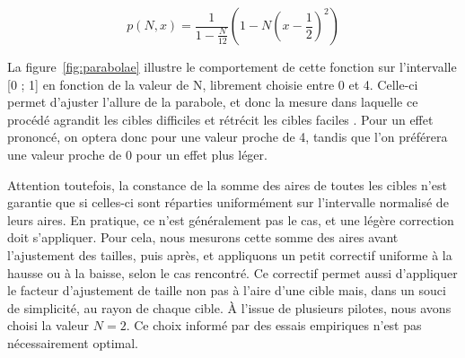 	\begin{equation}
		p(N,x) = \frac{1}{1-\frac{N}{12}} \left(1-N\left(x-\frac{1}{2}\right)^2\right)
		\label{eq:scalingParabola}
	\end{equation}
	
	La figure~\ref{fig:parabolae} illustre le comportement de cette fonction sur l'intervalle [0 ; 1] en fonction de la valeur de N, librement choisie entre 0 et 4. Celle-ci permet d'ajuster l'allure de la parabole, et donc la mesure dans laquelle ce procédé agrandit les cibles \og difficiles \fg{} et rétrécit les cibles \og faciles \fg{}. Pour un effet prononcé, on optera donc pour une valeur proche de 4, tandis que l'on préférera une valeur proche de 0 pour un effet plus léger.
	
	Attention toutefois, la constance de la somme des aires de toutes les cibles n'est garantie que si celles-ci sont réparties uniformément sur l'intervalle normalisé de leurs aires.\footnotemark{} En pratique, ce n'est généralement pas le cas, et une légère correction doit s'appliquer. Pour cela, nous mesurons cette somme des aires avant l'ajustement des tailles, puis après, et appliquons un petit correctif uniforme à la hausse ou à la baisse, selon le cas rencontré. Ce correctif permet aussi d'appliquer le facteur d'ajustement de taille non pas à l'aire d'une cible mais, dans un souci de simplicité, au rayon de chaque cible. À l'issue de plusieurs pilotes, nous avons choisi la valeur $N=2$. Ce choix informé par des essais empiriques n'est pas nécessairement optimal.

	
	
